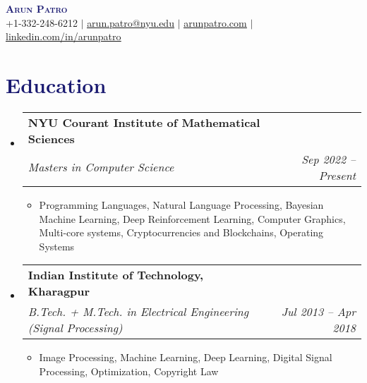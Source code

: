 \documentclass[letterpaper,10.7pt]{article}
\makeatletter
\newcommand{\resumeItem}[1]{
  \item\small{
    {#1 \vspace{-2pt}}
  }
}
\newcommand{\resumeSubheading}[4]{
  \vspace{-2pt}\item
    \begin{tabular*}{1.0\textwidth}[t]{l@{\extracolsep{\fill}}r}
      \textbf{#1} & \textbf{\small #2} \\
      \textit{\small#3} & \textit{\small #4} \\
    \end{tabular*}\vspace{-7pt}
}
\newcommand{\resumeSubHeadingListStart}{\begin{itemize}[leftmargin=0.0in, label={}]}
\newcommand{\resumeSubHeadingListEnd}{\end{itemize}}
\newcommand{\resumeItemListStart}{\begin{itemize}}
\newcommand{\resumeItemListEnd}{\end{itemize}\vspace{-5pt}}
\makeatother
\begin{document}

\begin{center}
  \textbf{\LARGE \scshape \textcolor{MidnightBlue}{Arun Patro}} \\ \vspace{1pt}
  \small +1-332-248-6212 $|$ \href{mailto:arun.patro@nyu.edu}{\underline{arun.patro@nyu.edu}} $|$ 
  \href{https://www.arunpatro.com}{\underline{arunpatro.com}} $|$ 
  \href{https://www.linkedin.com/in/arun-patro-2085a984/}{\underline{linkedin.com/in/arunpatro} 
  }
\end{center}


\section{\textcolor{MidnightBlue}{Education}}
\resumeSubHeadingListStart
\resumeSubheading
{NYU Courant Institute of Mathematical Sciences}{}
{Masters in Computer Science}{Sep 2022 -- Present}
\resumeItemListStart
\resumeItem{\small{{\color{MidnightBlue}{Key Courses:}}
Programming Languages, Natural Language Processing, Bayesian Machine Learning, Deep Reinforcement Learning, Computer Graphics, Multi-core systems, Cryptocurrencies and Blockchains, Operating Systems}}
\resumeItemListEnd %
\resumeSubheading
{Indian Institute of Technology, Kharagpur}{}
{B.Tech. + M.Tech. in Electrical Engineering (Signal Processing)}{Jul 2013 -- Apr 2018}
\resumeItemListStart
\resumeItem{\small{{\color{MidnightBlue}{Key Courses:}} Image Processing, Machine Learning, Deep Learning, Digital Signal Processing, Optimization, Copyright Law}}
\resumeItemListEnd \vspace{0.1in}
\resumeSubHeadingListEnd
\end{document}
